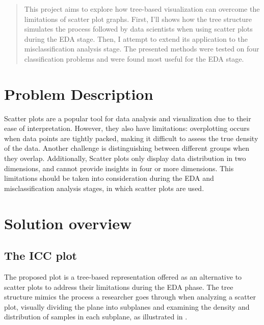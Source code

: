 \documentclass[11pt]{article}
\begin{document}
\maketitle

\begin{abstract}
This project aims to explore how tree-based visualization can overcome the limitations of scatter plot graphs. First, I'll shows how the tree structure simulates the process followed by data scientists when using scatter plots during the EDA stage. Then, I attempt to extend its application to the misclassification analysis stage. The presented methods were tested on four classification problems and were found most useful for the EDA stage.
\end{abstract}
\section{Problem Description}\label{Problem Description}
Scatter plots are a popular tool for data analysis and visualization due to their ease of interpretation. However, they also have limitations: overplotting occurs when data points are tightly packed, making it difficult to assess the true density of the data. Another challenge is distinguishing between different groups when they overlap. Additionally, Scatter plots only display data distribution in two dimensions, and cannot provide insights in four or more dimensions. This limitations should be taken into consideration during the EDA and misclassification analysis stages, in which scatter plots are used.
\section{Solution overview}\label{Solution overview}
\subsection{The ICC plot}\label{The ICC plot}
The proposed plot is a tree-based representation offered as an alternative to scatter plots to address their limitations during the EDA phase. The tree structure mimics the process a researcher goes through when analyzing a scatter plot, visually dividing the plane into subplanes and examining the density and distribution of samples in each subplane, as illustrated in .
\end{document}
